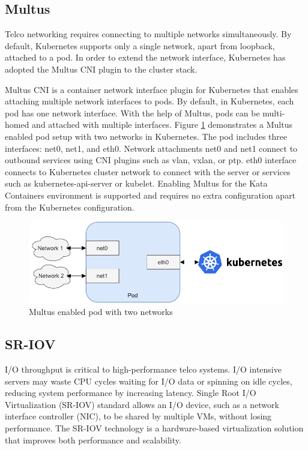 \subsection{Multus}

Telco networking requires connecting to multiple networks simultaneously. By default, Kubernetes supports only a single network, apart from loopback, attached to a pod. In order to extend the network interface, Kubernetes has adopted the Multus CNI plugin to the cluster stack.

Multus CNI \cite{Multus} is a container network interface plugin for Kubernetes that enables attaching multiple network interfaces to pods. By default, in Kubernetes, each pod has one network interface. With the help of Multus, pods can be multi-homed and attached with multiple interfaces. Figure \ref{fig:Multus} demonstrates a Multus enabled pod setup with two networks in Kubernetes. The pod includes three interfaces: net0, net1, and eth0. Network attachments net0 and net1 connect to outbound services using CNI plugins such as vlan, vxlan, or ptp. eth0 interface connects to Kubernetes cluster network to connect with the server or services such as kubernetes-api-server or kubelet. Enabling Multus for the Kata Containers environment is supported and requires no extra configuration apart from the Kubernetes configuration. \cite{MultusUbuntu}

\begin{figure}[ht]
  \begin{center}
    \includegraphics[width=13.5cm]{images/Multus.pdf}
    \caption{Multus enabled pod with two networks}
    \label{fig:Multus}
  \end{center}
\end{figure}

\subsection{SR-IOV}
\label{section:SR-IOV}

I/O throughput is critical to high-performance telco systems. I/O intensive servers may waste CPU cycles waiting for I/O data or spinning on idle cycles, reducing system performance by increasing latency. Single Root I/O Virtualization (SR-IOV) standard allows an I/O device, such as a network interface controller (NIC), to be shared by multiple VMs, without losing performance. The SR-IOV technology is a hardware-based virtualization solution that improves both performance and scalability. \cite{Dong2012}


